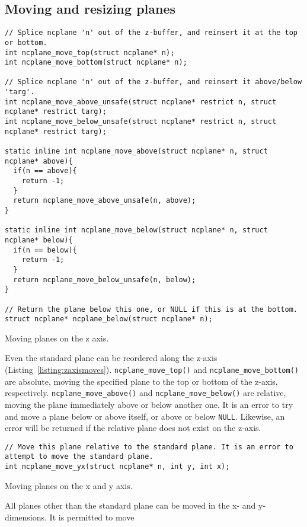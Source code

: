 \subsection{Moving and resizing planes}
\begin{listing}[!htb]
\begin{verbatim}
// Splice ncplane 'n' out of the z-buffer, and reinsert it at the top or bottom.
int ncplane_move_top(struct ncplane* n);
int ncplane_move_bottom(struct ncplane* n);

// Splice ncplane 'n' out of the z-buffer, and reinsert it above/below 'targ'.
int ncplane_move_above_unsafe(struct ncplane* restrict n, struct ncplane* restrict targ);
int ncplane_move_below_unsafe(struct ncplane* restrict n, struct ncplane* restrict targ);

static inline int ncplane_move_above(struct ncplane* n, struct ncplane* above){
  if(n == above){
    return -1;
  }
  return ncplane_move_above_unsafe(n, above);
}

static inline int ncplane_move_below(struct ncplane* n, struct ncplane* below){
  if(n == below){
    return -1;
  }
  return ncplane_move_below_unsafe(n, below);
}

// Return the plane below this one, or NULL if this is at the bottom.
struct ncplane* ncplane_below(struct ncplane* n);
\end{verbatim}
\caption{Moving planes on the z axis.}
\label{listing:zaxismoves}
\end{listing}
Even the standard plane can be reordered along the z-axis (Listing~\ref{listing:zaxismoves}).
\texttt{ncplane\_move\_top()} and \texttt{ncplane\_move\_bottom()} are absolute, moving the specified plane
to the top or bottom of the z-axis, respectively. \texttt{ncplane\_move\_above()}
and \texttt{ncplane\_move\_below()} are relative, moving the plane immediately
above or below another one. It is an error to try and move a plane below or above itself,
or above or below \texttt{NULL}. Likewise, an error will be returned if the relative
plane does not exist on the z-axis.
\begin{listing}[!htb]
\begin{verbatim}
// Move this plane relative to the standard plane. It is an error to attempt to move the standard plane.
int ncplane_move_yx(struct ncplane* n, int y, int x);
\end{verbatim}
\caption{Moving planes on the x and y axis.}
\label{list:xyaxismoves}
\end{listing}
All planes other than the standard plane can be moved in the x- and y-dimensions. It is permitted to move
